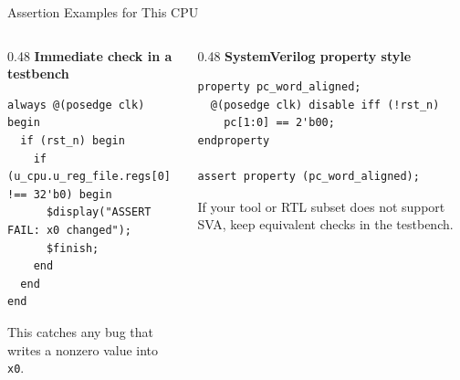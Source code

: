 \documentclass[aspectratio=169,10pt]{beamer}
\begin{document}
\begin{frame}[fragile]{Assertion Examples for This CPU}
  \begin{columns}[T]
    \begin{column}{0.48\textwidth}
      \textbf{Immediate check in a testbench}
\begin{lstlisting}
always @(posedge clk) begin
  if (rst_n) begin
    if (u_cpu.u_reg_file.regs[0] !== 32'b0) begin
      $display("ASSERT FAIL: x0 changed");
      $finish;
    end
  end
end
\end{lstlisting}

      \vspace{0.4em}
      \small
      This catches any bug that writes a nonzero value into \texttt{x0}.
    \end{column}
    \begin{column}{0.48\textwidth}
      \textbf{SystemVerilog property style}
\begin{lstlisting}
property pc_word_aligned;
  @(posedge clk) disable iff (!rst_n)
    pc[1:0] == 2'b00;
endproperty

assert property (pc_word_aligned);
\end{lstlisting}

      \vspace{0.4em}
      \small
      If your tool or RTL subset does not support SVA, keep equivalent checks in the testbench.
    \end{column}
  \end{columns}
\end{frame}
\end{document}

